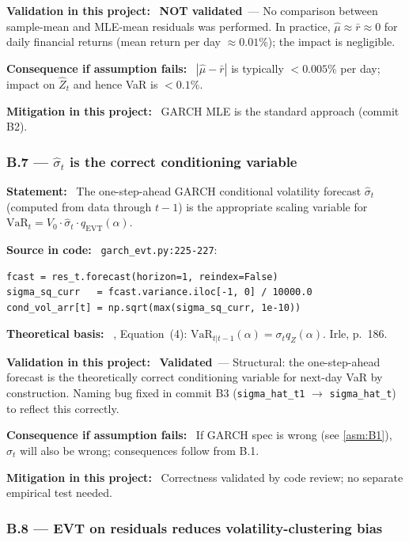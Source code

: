 \documentclass[11pt,a4paper]{article}
\newcommand{\asmfield}[1]{\medskip\noindent\textbf{#1:}\ }
\newcommand{\code}[1]{\texttt{#1}}
\newcommand{\validated}{\textbf{Validated}}
\newcommand{\notvalidated}{\textbf{NOT validated}}
\begin{document}
\asmfield{Validation in this project}
\notvalidated\ --- No comparison between sample-mean and MLE-mean residuals
was performed. In practice, $\hat{\mu} \approx \bar{r} \approx 0$ for daily
financial returns (mean return per day $\approx 0.01\%$); the impact is
negligible.

\asmfield{Consequence if assumption fails}
$|\hat{\mu} - \bar{r}|$ is typically $< 0.005\%$ per day; impact on $\hat{Z}_t$
and hence VaR is $< 0.1\%$.

\asmfield{Mitigation in this project}
GARCH MLE is the standard approach (commit B2).

\subsubsection{B.7 --- $\hat{\sigma}_t$ is the correct conditioning variable}\label{asm:B7}

\asmfield{Statement}
The one-step-ahead GARCH conditional volatility forecast $\hat{\sigma}_t$
(computed from data through $t-1$) is the appropriate scaling variable for
$\text{VaR}_t = V_0 \cdot \hat{\sigma}_t \cdot q_{\mathrm{EVT}}(\alpha)$.

\asmfield{Source in code}
\code{garch\_evt.py:225-227}:
\begin{lstlisting}
fcast = res_t.forecast(horizon=1, reindex=False)
sigma_sq_curr   = fcast.variance.iloc[-1, 0] / 10000.0
cond_vol_arr[t] = np.sqrt(max(sigma_sq_curr, 1e-10))
\end{lstlisting}

\asmfield{Theoretical basis}
\cite{McNeilFrey2000}, Equation~(4): $\text{VaR}_{t|t-1}(\alpha) =
\sigma_t q_Z(\alpha)$. Irle, p.~186.

\asmfield{Validation in this project}
\validated\ --- Structural: the one-step-ahead forecast is the theoretically
correct conditioning variable for next-day VaR by construction. Naming bug
fixed in commit B3 (\code{sigma\_hat\_t1} $\to$ \code{sigma\_hat\_t}) to
reflect this correctly.

\asmfield{Consequence if assumption fails}
If GARCH spec is wrong (see \cref{asm:B1}), $\hat{\sigma}_t$ will also
be wrong; consequences follow from B.1.

\asmfield{Mitigation in this project}
Correctness validated by code review; no separate empirical test needed.

\subsubsection{B.8 --- EVT on residuals reduces volatility-clustering bias}\label{asm:B8}
\end{document}
